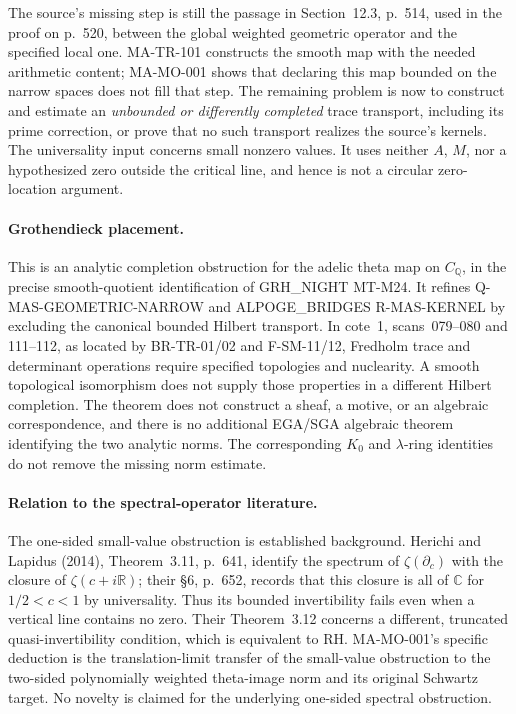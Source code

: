 The source's missing step is still the passage in Section~12.3,
p.~514, used in the proof on p.~520, between the global weighted
geometric operator and the specified local one. MA-TR-101
constructs the smooth map with the needed arithmetic content;
MA-MO-001 shows that declaring this map bounded on the narrow
spaces does not fill that step. The remaining problem is now
to construct and estimate an \emph{unbounded or differently
completed} trace transport, including its prime correction,
or prove that no such transport realizes the source's kernels.
The universality input concerns small nonzero values. It uses
neither $A$, $M$, nor a hypothesized zero outside the critical
line, and hence is not a circular zero-location argument.

\paragraph{Grothendieck placement.}
This is an analytic completion obstruction for the adelic
theta map on $C_{\mathbb Q}$, in the precise smooth-quotient
identification of GRH\_NIGHT MT-M24. It refines
Q-MAS-GEOMETRIC-NARROW and ALPOGE\_BRIDGES R-MAS-KERNEL by
excluding the canonical bounded Hilbert transport.
In cote~1, scans~079--080 and 111--112, as located by
BR-TR-01/02 and F-SM-11/12, Fredholm trace and determinant
operations require specified topologies and nuclearity.
A smooth topological isomorphism does not supply those
properties in a different Hilbert completion. The theorem
does not construct a sheaf, a motive, or an algebraic
correspondence, and there is no additional EGA/SGA algebraic
theorem identifying the two analytic norms. The corresponding
$K_0$ and $\lambda$-ring identities do not remove the missing
norm estimate.

\paragraph{Relation to the spectral-operator literature.}
The one-sided small-value obstruction is established background.
Herichi and Lapidus (2014), Theorem~3.11, p.~641, identify the
spectrum of $\zeta(\partial_c)$ with the closure of
$\zeta(c+i\mathbb R)$; their \S6, p.~652, records that this
closure is all of $\mathbb C$ for $1/2<c<1$ by universality.
Thus its bounded invertibility fails even when a vertical line
contains no zero. Their Theorem~3.12 concerns a different,
truncated quasi-invertibility condition, which is equivalent to RH.
MA-MO-001's specific deduction is the translation-limit transfer
of the small-value obstruction to the two-sided polynomially
weighted theta-image norm and its original Schwartz target.
No novelty is claimed for the underlying one-sided spectral
obstruction.

